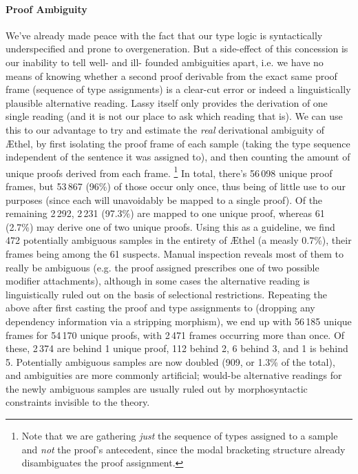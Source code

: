 \paragraph{Proof Ambiguity}
We've already made peace with the fact that our type logic is syntactically underspecified and prone to overgeneration.
But a side-effect of this concession is our inability to tell well- and ill- founded ambiguities apart, i.e. we have no means of knowing whether a second proof derivable from the exact same proof frame (sequence of type assignments) is a clear-cut error or indeed a linguistically plausible alternative reading.
Lassy itself only provides the derivation of one single reading (and it is not our place to ask which reading that is).
We can use this to our advantage to try and estimate the \textit{real} derivational ambiguity of \AE thel, by first isolating the proof frame of each sample (taking the type sequence independent of the sentence it was assigned to), and then counting the amount of unique proofs derived from each frame.%
	\footnote{Note that we are gathering \textit{just} the sequence of types assigned to a sample and \textit{not} the proof's antecedent, since the modal bracketing structure already disambiguates the proof assignment.}
In total, there's 56\,098 unique proof frames, but 53\,867 (96\%) of those occur only once, thus being of little use to our purposes (since each will unavoidably be mapped to a single proof).
Of the remaining 2\,292, 2\,231 (97.3\%) are mapped to one unique proof, whereas 61 (2.7\%) may derive one of two unique proofs.
Using this as a guideline, we find 472 potentially ambiguous samples in the entirety of \AE thel (a measly 0.7\%), their frames being among the 61 suspects.
Manual inspection reveals most of them to really be ambiguous (e.g. the proof assigned prescribes one of two possible modifier attachments), 
although in some cases the alternative reading is linguistically ruled out on the basis of selectional restrictions.
Repeating the above after first casting the proof and type assignments to \NLP{} (dropping any dependency information via a stripping morphism), we end up with 56\,185 unique frames for 54\,170 unique proofs, with 2\,471 frames occurring more than once.
Of these, 2\,374 are behind 1 unique proof, 112 behind 2, 6 behind 3, and 1 is behind 5.
Potentially ambiguous samples are now doubled (909, or 1.3\% of the total), and ambiguities are more commonly artificial; would-be alternative readings for the newly ambiguous samples are usually ruled out by morphosyntactic constraints invisible to the theory.

